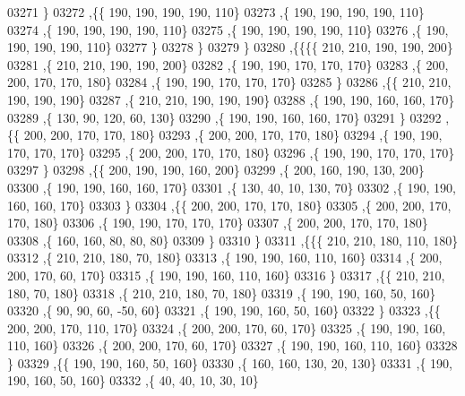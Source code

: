 \begin{DoxyCode}
03271     \}
03272    ,\{\{   190,   190,   190,   190,   110\}
03273     ,\{   190,   190,   190,   190,   110\}
03274     ,\{   190,   190,   190,   190,   110\}
03275     ,\{   190,   190,   190,   190,   110\}
03276     ,\{   190,   190,   190,   190,   110\}
03277     \}
03278    \}
03279   \}
03280  ,\{\{\{\{   210,   210,   190,   190,   200\}
03281     ,\{   210,   210,   190,   190,   200\}
03282     ,\{   190,   190,   170,   170,   170\}
03283     ,\{   200,   200,   170,   170,   180\}
03284     ,\{   190,   190,   170,   170,   170\}
03285     \}
03286    ,\{\{   210,   210,   190,   190,   190\}
03287     ,\{   210,   210,   190,   190,   190\}
03288     ,\{   190,   190,   160,   160,   170\}
03289     ,\{   130,    90,   120,    60,   130\}
03290     ,\{   190,   190,   160,   160,   170\}
03291     \}
03292    ,\{\{   200,   200,   170,   170,   180\}
03293     ,\{   200,   200,   170,   170,   180\}
03294     ,\{   190,   190,   170,   170,   170\}
03295     ,\{   200,   200,   170,   170,   180\}
03296     ,\{   190,   190,   170,   170,   170\}
03297     \}
03298    ,\{\{   200,   190,   190,   160,   200\}
03299     ,\{   200,   160,   190,   130,   200\}
03300     ,\{   190,   190,   160,   160,   170\}
03301     ,\{   130,    40,    10,   130,    70\}
03302     ,\{   190,   190,   160,   160,   170\}
03303     \}
03304    ,\{\{   200,   200,   170,   170,   180\}
03305     ,\{   200,   200,   170,   170,   180\}
03306     ,\{   190,   190,   170,   170,   170\}
03307     ,\{   200,   200,   170,   170,   180\}
03308     ,\{   160,   160,    80,    80,    80\}
03309     \}
03310    \}
03311   ,\{\{\{   210,   210,   180,   110,   180\}
03312     ,\{   210,   210,   180,    70,   180\}
03313     ,\{   190,   190,   160,   110,   160\}
03314     ,\{   200,   200,   170,    60,   170\}
03315     ,\{   190,   190,   160,   110,   160\}
03316     \}
03317    ,\{\{   210,   210,   180,    70,   180\}
03318     ,\{   210,   210,   180,    70,   180\}
03319     ,\{   190,   190,   160,    50,   160\}
03320     ,\{    90,    90,    60,   -50,    60\}
03321     ,\{   190,   190,   160,    50,   160\}
03322     \}
03323    ,\{\{   200,   200,   170,   110,   170\}
03324     ,\{   200,   200,   170,    60,   170\}
03325     ,\{   190,   190,   160,   110,   160\}
03326     ,\{   200,   200,   170,    60,   170\}
03327     ,\{   190,   190,   160,   110,   160\}
03328     \}
03329    ,\{\{   190,   190,   160,    50,   160\}
03330     ,\{   160,   160,   130,    20,   130\}
03331     ,\{   190,   190,   160,    50,   160\}
03332     ,\{    40,    40,    10,    30,    10\}

\end{DoxyCode}
